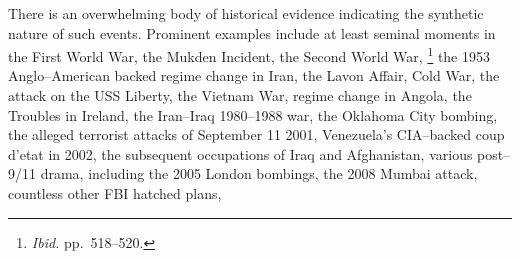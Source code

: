 There is an overwhelming body of historical evidence indicating the synthetic nature of such events. Prominent examples include at least seminal moments in the First World War,
the Mukden Incident,
the Second World War,
\footnotecite[extras={ p.~193.}][shirer1960]\footnote{{\it Ibid.} pp.~518--520.} %
the 1953 Anglo--American backed regime change in Iran,
\footnotecite[gasiorowski2000] %
the Lavon Affair,
Cold War,
\footnotecite[northwoods]
the attack on the USS Liberty,
the Vietnam War,
\footnotecite[bumiller2010] %
regime change in Angola,
the Troubles in Ireland,
the Iran--Iraq 1980--1988 war,
the Oklahoma City bombing,
the alleged terrorist attacks of September 11 2001, %
\footnotecite[gourley2012] 
\footnotecite[harrit2009]
Venezuela's CIA--backed coup d'etat in 2002, %
the subsequent occupations of Iraq %
and Afghanistan, %
\footnotecite[extras={ p.~74.}][grad2009]
various post--9/11 drama, %
\footnotecite[king2010] 
including the 2005 London bombings, %
\footnotecite[secker2010] 
the 2008 Mumbai attack, %
countless other FBI hatched plans, %

